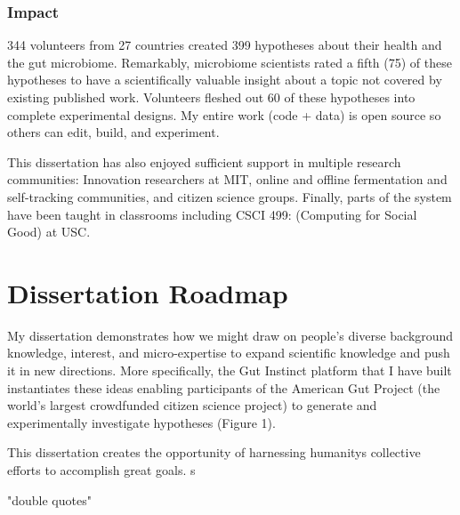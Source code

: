 \subsubsection{Impact}
344 volunteers from 27 countries created 399 hypotheses about their health and the gut microbiome. Remarkably, microbiome scientists rated a fifth (75) of these hypotheses to have a scientifically valuable insight about a topic not covered by existing published work. Volunteers fleshed out 60 of these hypotheses into complete experimental designs. My entire work (code + data) is open source so others can edit, build, and experiment.

This dissertation has also enjoyed sufficient support in multiple research communities: Innovation researchers at MIT, online and offline fermentation and self-tracking communities, and citizen science groups. Finally, parts of the system have been taught in classrooms including CSCI 499: (Computing for Social Good) at USC. 

\section{Dissertation Roadmap}


My dissertation demonstrates how we might draw on people’s diverse background knowledge, interest, and micro-expertise to expand scientific knowledge and push it in new directions. More specifically, the Gut Instinct platform that I have built instantiates these ideas enabling participants of the American Gut Project (the world’s largest crowdfunded citizen science project) to generate and experimentally investigate hypotheses (Figure 1). 

This dissertation creates the opportunity of harnessing humanity\textquotesingle s collective efforts to accomplish great goals.
s


"double quotes"




